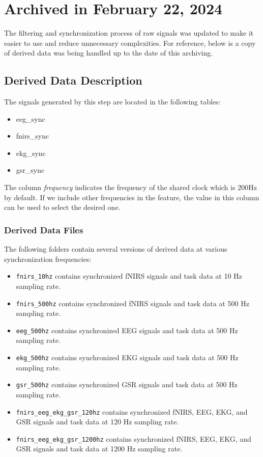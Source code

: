 \chapter{Archived in February 22, 2024}

The filtering and synchronization process of raw signals was updated to make it easier to use and reduce unnecessary complexities. For reference, below is a copy of derived data was being handled up to the date of this archiving.
\section{Derived Data Description}

The signals generated by this step are located in the following tables:

\begin{itemize}
	\item eeg\_sync
	\item fnirs\_sync
	\item ekg\_sync
	\item gsr\_sync
\end{itemize}

The column \emph{frequency} indicates the frequency of the shared clock which is 200Hz by default. If we include other frequencies in the feature, the value in this column can be used to select the desired one.


\subsection{Derived Data Files}

The following folders contain several versions of derived data at various synchronization frequencies:
\begin{itemize}
  \item \texttt{fnirs\_10hz} contains synchronized fNIRS signals and task data at 10 Hz sampling rate.
  \item \texttt{fnirs\_500hz} contains synchronized fNIRS signals and task data at 500 Hz sampling rate.
  \item \texttt{eeg\_500hz} contains synchronized EEG signals and task data at 500 Hz sampling rate.
  \item \texttt{ekg\_500hz} contains synchronized EKG signals and task data at 500 Hz sampling rate.
  \item \texttt{gsr\_500hz} contains synchronized GSR signals and task data at 500 Hz sampling rate.
  \item \texttt{fnirs\_eeg\_ekg\_gsr\_120hz} contains synchronized fNIRS, EEG, EKG, and GSR signals and task data at 120 Hz sampling rate.
  \item \texttt{fnirs\_eeg\_ekg\_gsr\_1200hz} contains synchronized fNIRS, EEG, EKG, and GSR signals and task data at 1200 Hz sampling rate.
\end{itemize}

